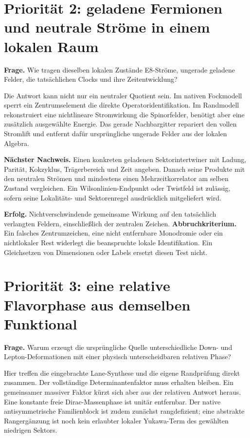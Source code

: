 \documentclass[11pt,a4paper,oneside,parskip=half,headings=normal,numbers=noenddot,bibliography=totoc]{scrreprt}
\begin{document}
\section{Priorität 2: geladene Fermionen und neutrale Ströme in einem lokalen Raum}
\textbf{Frage.} Wie tragen dieselben lokalen Zustände E8-Ströme, ungerade geladene Felder, die tatsächlichen Clocks und ihre Zeitentwicklung?

Die Antwort kann nicht nur ein neutraler Quotient sein. Im nativen Fockmodell sperrt ein Zentrumselement die direkte Operatoridentifikation. Im Randmodell rekonstruiert eine nichtlineare Stromwirkung die Spinorfelder, benötigt aber eine zusätzlich ausgewählte Energie. Das gerade Nachbargitter repariert den vollen Stromlift und entfernt dafür ursprüngliche ungerade Felder aus der lokalen Algebra.

\textbf{Nächster Nachweis.} Einen konkreten geladenen Sektorintertwiner mit Ladung, Parität, Kokzyklus, Trägerbereich und Zeit angeben. Danach seine Produkte mit den neutralen Strömen und mindestens einen Mehrzeitkorrelator am selben Zustand vergleichen. Ein Wilsonlinien-Endpunkt oder Twistfeld ist zulässig, sofern seine Lokalitäts- und Sektorenregel ausdrücklich mitgeliefert wird.

\textbf{Erfolg.} Nichtverschwindende gemeinsame Wirkung auf den tatsächlich verlangten Feldern, einschließlich der zentralen Zeichen. \textbf{Abbruchkriterium.} Ein falsches Zentrumzeichen, eine nicht entfernbare Monodromie oder ein nichtlokaler Rest widerlegt die beanspruchte lokale Identifikation. Ein Gleichsetzen von Dimensionen oder Labels ersetzt diesen Test nicht.

\section{Priorität 3: eine relative Flavorphase aus demselben Funktional}
\textbf{Frage.} Warum erzeugt die ursprüngliche Quelle unterschiedliche Down- und Lepton-Deformationen mit einer physisch unterscheidbaren relativen Phase?

Hier treffen die eingebrachte Lane-Synthese und die eigene Randprüfung direkt zusammen. Der vollständige Determinantenfaktor muss erhalten bleiben. Ein gemeinsamer massiver Faktor kürzt sich aber aus der relativen Antwort heraus. Eine konstante freie Dirac-Massenphase ist unitär entfernbar. Der native antisymmetrische Familienblock ist zudem zunächst rangdefizient; eine abstrakte Rangergänzung ist noch kein erlaubter lokaler Yukawa-Term des gewählten niedrigen Sektors.
\end{document}

